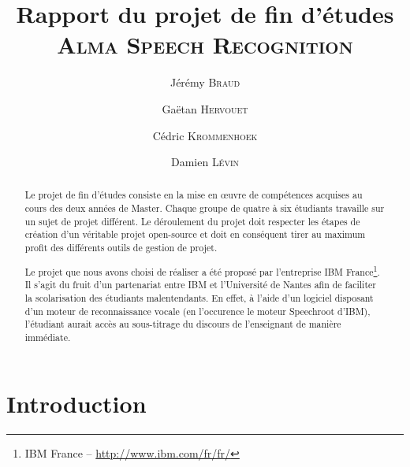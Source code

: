 \documentclass[a4paper,11pt]{report}
\title{Rapport du projet de fin d'études\\
	\huge{\textsc{Alma Speech Recognition}}}
\author{Jérémy \textsc{Braud} \and Gaëtan \textsc{Hervouet} \and Cédric \textsc{Krommenhoek} \and Damien \textsc{Lévin}}
\begin{document}
\maketitle

\begin{abstract}
Le projet de fin d'études consiste en la mise en \oe{}uvre de compétences acquises au cours des deux années de Master.
Chaque groupe de quatre à six étudiants travaille sur un sujet de projet différent.
Le déroulement du projet doit respecter les étapes de création d'un véritable projet open-source et doit en conséquent tirer au maximum profit des différents outils de gestion de projet.

Le projet que nous avons choisi de réaliser a été proposé par l'entreprise IBM France\footnote{IBM France -- \url{http://www.ibm.com/fr/fr/}}.
Il s'agit du fruit d'un partenariat entre IBM et l'Université de Nantes afin de faciliter la scolarisation des étudiants malentendants.
En effet, à l'aide d'un logiciel disposant d'un moteur de reconnaissance vocale (en l'occurence le moteur Speechroot d'IBM), l'étudiant aurait accès au sous-titrage du discours de l'enseignant de manière immédiate.
\end{abstract}

\tableofcontents

\chapter*{Introduction}
\end{document}
